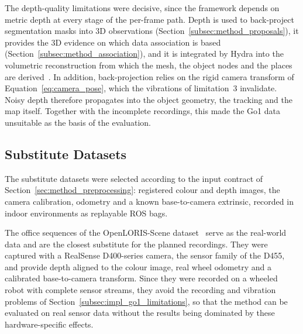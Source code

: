 {\small The depth-quality limitations were decisive, since the framework depends on metric depth at every stage of the per-frame path. Depth is used to back-project segmentation masks into 3D observations (Section~\ref{subsec:method_proposals}), it provides the 3D evidence on which data association is based (Section~\ref{subsec:method_association}), and it is integrated by Hydra into the volumetric reconstruction from which the mesh, the object nodes and the places are derived~\cite{hughes2022hydra}. In addition, back-projection relies on the rigid camera transform of Equation~\eqref{eq:camera_pose}, which the vibrations of limitation~3 invalidate. Noisy depth therefore propagates into the object geometry, the tracking and the map itself. Together with the incomplete recordings, this made the Go1 data unsuitable as the basis of the evaluation.\par}

\subsection{Substitute Datasets}
\label{subsec:impl_datasets}

{\small The substitute datasets were selected according to the input contract of Section~\ref{sec:method_preprocessing}: registered colour and depth images, the camera calibration, odometry and a known base-to-camera extrinsic, recorded in indoor environments as replayable ROS bags.\par}

{\small The office sequences of the OpenLORIS-Scene dataset~\cite{shi2020openloris} serve as the real-world data and are the closest substitute for the planned recordings. They were captured with a RealSense D400-series camera, the sensor family of the D455, and provide depth aligned to the colour image, real wheel odometry and a calibrated base-to-camera transform. Since they were recorded on a wheeled robot with complete sensor streams, they avoid the recording and vibration problems of Section~\ref{subsec:impl_go1_limitations}, so that the method can be evaluated on real sensor data without the results being dominated by these hardware-specific effects.\par}

